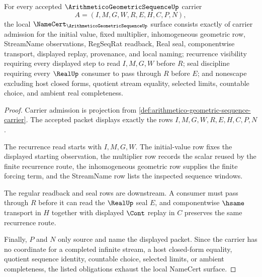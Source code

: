 \begin{theorem}
\label{thm:arithmetico-geometric-sequence-namecert-obligations}
For every accepted $\ArithmeticoGeometricSequenceUp$ carrier
$$
A=(I,M,G,W,R,E,H,C,P,N),
$$
the local $\NameCert_{\ArithmeticoGeometricSequenceUp}$ surface consists exactly of carrier admission for the initial value, fixed multiplier, inhomogeneous geometric row, StreamName observations, RegSeqRat readback, Real seal, componentwise transport, displayed replay, provenance, and local naming; recurrence visibility requiring every displayed step to read $I,M,G,W$ before $R$; seal discipline requiring every $\RealUp$ consumer to pass through $R$ before $E$; and nonescape excluding host closed forms, quotient stream equality, selected limits, countable choice, and ambient real completeness.
\end{theorem}
\begin{proof}
Carrier admission is projection from \autoref{def:arithmetico-geometric-sequence-carrier}. The accepted packet displays exactly the rows $I,M,G,W,R,E,H,C,P,N$.

The recurrence read starts with $I,M,G,W$. The initial-value row fixes the displayed starting observation, the multiplier row records the scalar reused by the finite recurrence route, the inhomogeneous geometric row supplies the finite forcing term, and the StreamName row lists the inspected sequence windows.

The regular readback and seal rows are downstream. A consumer must pass through $R$ before it can read the $\RealUp$ seal $E$, and componentwise $\hsame$ transport in $H$ together with displayed $\Cont$ replay in $C$ preserves the same recurrence route.

Finally, $P$ and $N$ only source and name the displayed packet. Since the carrier has no coordinate for a completed infinite stream, a host closed-form equality, quotient sequence identity, countable choice, selected limits, or ambient completeness, the listed obligations exhaust the local NameCert surface.
\end{proof}


